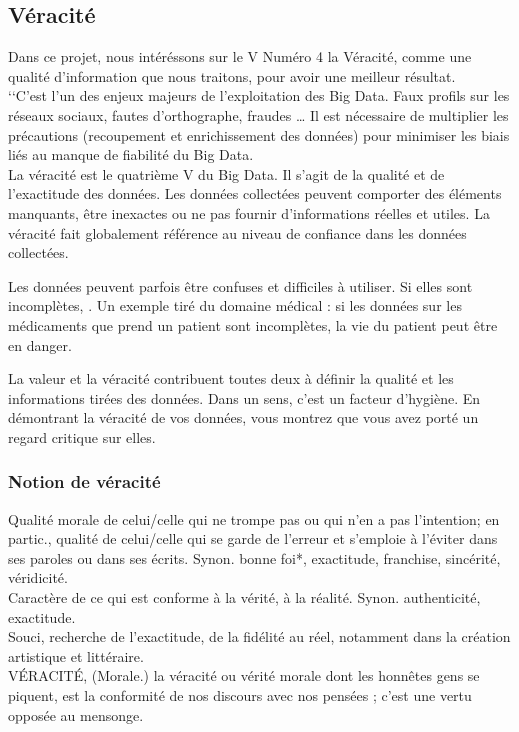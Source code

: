 \documentclass[12pt]{report}
\begin{document}
\subsection{Véracité}
Dans ce projet, nous intéréssons sur le V Numéro 4 la Véracité, comme une qualité d'information que nous traitons, pour avoir une meilleur résultat.
\\
‘‘C'est l'un des enjeux majeurs de l'exploitation des Big Data. Faux profils
sur les réseaux sociaux, fautes d'orthographe, fraudes … Il est nécessaire
de multiplier les précautions (recoupement et enrichissement des données)
pour minimiser les biais liés au manque de fiabilité du Big Data\cite{35}.\\

La véracité est le quatrième V du Big Data. Il s’agit de la qualité et de l’exactitude des données. Les données collectées peuvent comporter des éléments manquants, être inexactes ou ne pas fournir d’informations réelles et utiles. La véracité fait globalement référence au niveau de confiance dans les données collectées.

Les données peuvent parfois être confuses et difficiles à utiliser. Si elles sont incomplètes, . Un exemple tiré du domaine médical : si les données sur les médicaments que prend un patient sont incomplètes, la vie du patient peut être en danger.

La valeur et la véracité contribuent toutes deux à définir la qualité et les informations tirées des données. Dans un sens, c’est un facteur d’hygiène. En démontrant la véracité de vos données, vous montrez que vous avez porté un regard critique sur elles.

\subsubsection{Notion de véracité}
Qualité morale de celui/celle qui ne trompe pas ou qui n'en a pas l'intention; en partic., qualité de celui/celle qui se garde de l'erreur et s'emploie à l'éviter dans ses paroles ou dans ses écrits. Synon. bonne foi*, exactitude, franchise, sincérité, véridicité.\\
Caractère de ce qui est conforme à la vérité, à la réalité. Synon. authenticité, exactitude.\\
Souci, recherche de l'exactitude, de la fidélité au réel, notamment dans la création artistique et littéraire.\\
VÉRACITÉ, (Morale.) la véracité ou vérité morale dont les honnêtes gens se piquent, est la conformité de nos discours avec nos pensées ; c’est une vertu opposée au mensonge\cite{36}.\\
\end{document}
